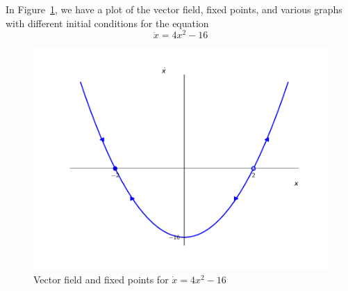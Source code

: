 
In Figure~\ref{fig2_2_1vecfield}, we have a plot of the vector field, fixed points,
and various graphs with different initial conditions for the equation 
\[
    \dot{x} = 4x^2 - 16
\]
\begin{figure}[!ht]
    \includegraphics[scale=0.6, center]{../plots/ch02/ex2_2_1.pdf}
    \caption{Vector field and fixed points for $\dot{x} = 4x^2 - 16$\label{fig2_2_1vecfield}}
\end{figure}
